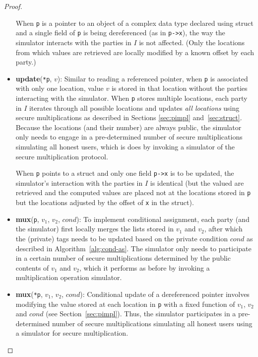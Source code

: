 \documentclass[11pt]{article}
\begin{document}
\begin{proof}
\begin{itemize}
    When \texttt{p} is a pointer to an object of a complex data type
    declared using struct and a single field of \texttt{p} is being
    dereferenced (as in \texttt{p->x}), the way the simulator interacts with
    the parties in $I$ is not affected. (Only the locations from which
    values are retrieved are locally modified by a known offset by each
    party.)
    
  \item \textbf{update}(\texttt{*p}, $v$): Similar to reading a referenced
    pointer, when \texttt{p} is associated with only one location, value $v$
    is stored in that location without the parties interacting with the
    simulator. When \texttt{p} stores multiple locations, each party in $I$
    iterates through all possible locations and updates \emph{all locations}
    using secure multiplications as described in Sections \ref{sec:pimpl}
    and~\ref{sec:struct}. Because the locations (and their number) are
    always public, the simulator only needs to engage in a pre-determined
    number of secure multiplications simulating all honest users, which is
    does by invoking a simulator of the secure multiplication protocol.
    
    When \texttt{p} points to a struct and only one field \texttt{p->x} is
    to be updated, the simulator's interaction with the parties in $I$ is
    identical (but the valued are retrieved and the computed values are
    placed not at the locations stored in \texttt{p} but the locations
    adjusted by the offset of \texttt{x} in the struct).
    
  \item \textbf{mux}(\texttt{p}, $v_1$, $v_2$, $cond$): To implement
    conditional assignment, each party (and the simulator) first locally
    merges the lists stored in $v_1$ and $v_2$, after which the (private)
    tags needs to be updated based on the private condition $cond$ as
    described in Algorithm~\ref{alg:cond-as}. The simulator only needs to
    participate in a certain number of secure multiplications determined by
    the public contents of $v_1$ and $v_2$, which it performs as before
    by invoking a multiplication operation simulator.
    
  \item \textbf{mux}(\texttt{*p}, $v_1$, $v_2$, $cond$): Conditional update
    of a dereferenced pointer involves modifying the value stored at each
    location in \texttt{p} with a fixed function of $v_1$, $v_2$ and $cond$
    (see Section~\ref{sec:pimpl}). Thus, the simulator participates in a
    pre-determined number of secure multiplications simulating all honest
    users using a simulator for secure multiplication.
    

\end{itemize}
\end{proof}
\end{document}

